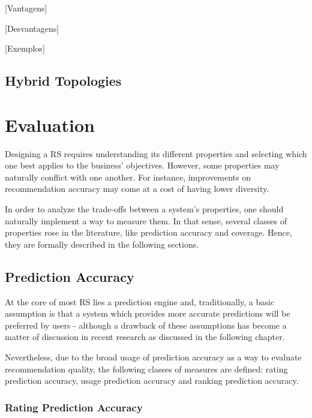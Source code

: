   [Vantagens]

  [Desvantagens]

  [Exemplos]

\subsection{Hybrid Topologies}


\section{Evaluation}



Designing a RS requires understanding its different properties and selecting which one best applies to the business' objectives. However, some properties may naturally conflict with one another. For instance, improvements on recommendation accuracy may come at a cost of having lower diversity. 

In order to analyze the trade-offs between a system's properties, one should naturally implement a way to measure them. In that sense, several classes of properties rose in the literature, like prediction accuracy and coverage. Hence, they are formally described in the following sections. 

\subsection{Prediction Accuracy}

At the core of most RS lies a prediction engine and, traditionally, a basic assumption is that a system which provides more accurate predictions will be preferred by users - although a drawback of these assumptions has become a matter of discussion in recent research as discussed in the following chapter. 

Nevertheless, due to the broad usage of prediction accuracy as a way to evaluate recommendation quality, the following classes of measures are defined: rating prediction accuracy, usage prediction accuracy and ranking prediction accuracy.

\subsubsection{Rating Prediction Accuracy}

